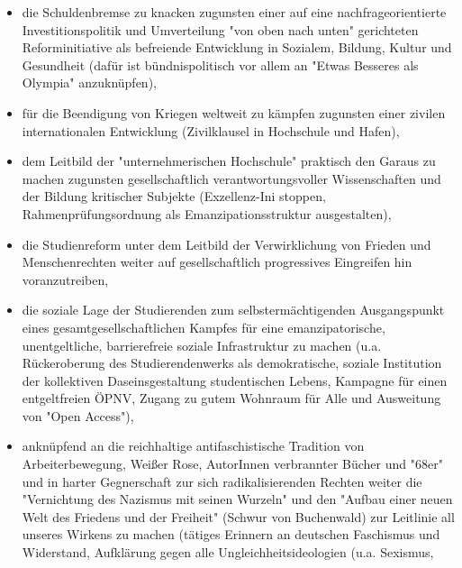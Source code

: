 \documentclass[ngerman,headheight=70pt]{scrartcl}
\begin{document}
    \begin{itemize}
        \item die Schuldenbremse zu knacken zugunsten einer auf eine
              nachfrageorientierte Investitionspolitik und Umverteilung "von oben
              nach unten" gerichteten Reforminitiative als befreiende Entwicklung
              in Sozialem, Bildung, Kultur und Gesundheit (dafür ist
              bündnispolitisch vor allem an "Etwas Besseres als Olympia"
              anzuknüpfen),
        \item für die Beendigung von Kriegen weltweit zu kämpfen zugunsten
              einer zivilen internationalen Entwicklung (Zivilklausel in Hochschule
              und Hafen),
        \item dem Leitbild der "unternehmerischen Hochschule" praktisch den
              Garaus zu machen zugunsten gesellschaftlich verantwortungsvoller
              Wissenschaften und der Bildung kritischer Subjekte (Exzellenz-Ini
              stoppen, Rahmenprüfungsordnung als Emanzipationsstruktur
              ausgestalten),
        \item die Studienreform unter dem Leitbild der Verwirklichung von Frieden
              und Menschenrechten weiter auf gesellschaftlich progressives
              Eingreifen hin voranzutreiben,
        \item die soziale Lage der Studierenden zum selbstermächtigenden
              Ausgangspunkt eines gesamtgesellschaftlichen Kampfes für eine
              emanzipatorische, unentgeltliche, barrierefreie soziale
              Infrastruktur zu machen (u.a. Rückeroberung des Studierendenwerks
              als demokratische, soziale Institution der kollektiven
              Daseinsgestaltung studentischen Lebens, Kampagne für einen
              entgeltfreien ÖPNV, Zugang zu gutem Wohnraum für Alle und
              Ausweitung von "Open Access"),
        \item anknüpfend an die reichhaltige antifaschistische Tradition von
              Arbeiterbewegung, Weißer Rose, AutorInnen verbrannter Bücher und
              "68er" und in harter Gegnerschaft zur sich radikalisierenden
              Rechten weiter die "Vernichtung des Nazismus mit seinen Wurzeln"
              und den "Aufbau einer neuen Welt des Friedens und der Freiheit"
              (Schwur von Buchenwald) zur Leitlinie all unseres Wirkens zu machen
              (tätiges Erinnern an deutschen Faschismus und Widerstand, Aufklärung
              gegen alle Ungleichheitsideologien (u.a. Sexismus,

\end{itemize}
\end{document}
